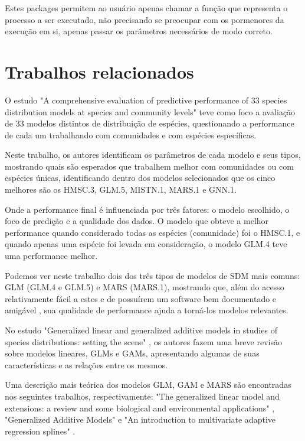 \documentclass[
    12pt,               %
    openright,          %
    oneside,            %
    a4paper,            %
    english,            %
    brazil              %
    ]{abntex2}
\begin{document}
Estes packages permitem ao usuário apenas chamar a função que representa o processo a ser executado, não precisando se preocupar com
os pormenores da execução em si, apenas passar os parâmetros necessários de modo correto.

\section{Trabalhos relacionados}

O estudo "A comprehensive evaluation of predictive performance of 33 species distribution models at species and community levels"
\cite{predPerform33models} teve como foco a avaliação de 33 modelos distintos de distribuição de espécies, questionando a
performance de cada um trabalhando com comunidades e com espécies específicas.

Neste trabalho, os autores identificam os parâmetros de cada modelo e seus tipos, mostrando quais são esperados que trabalhem melhor
com comunidades ou com espécies únicas, identificando dentro dos modelos selecionados que os cinco melhores são os HMSC.3, GLM.5,
MISTN.1, MARS.1 e GNN.1.

Onde a performance final é influenciada por três fatores: o modelo escolhido, o foco de predição e a qualidade dos dados. O modelo
que obteve a melhor performance quando considerado todas as espécies (comunidade) foi o HMSC.1, e quando apenas uma 
espécie foi levada em consideração, o modelo GLM.4 teve uma performance melhor.

Podemos ver neste trabalho dois dos três tipos de modelos de SDM mais comuns: GLM (GLM.4 e GLM.5) e MARS (MARS.1), mostrando que,
além do acesso relativamente fácil a estes e de possuírem um software bem documentado e amigável \cite{predPerform33models}, sua 
qualidade de performance ajuda a torná-los modelos relevantes.

No estudo "Generalized linear and generalized additive models in studies of species distributions: setting the scene" 
\cite{GAMeGLM_especie_estudo}, os autores fazem uma breve revisão sobre modelos lineares, GLMs e GAMs, apresentando algumas
de suas características e as relações entre os mesmos.

Uma descrição mais teórica dos modelos GLM, GAM e MARS são encontradas nos seguintes trabalhos, respectivamente: "The generalized 
linear model and extensions: a review and some biological and environmental applications" \cite{GLM}, "Generalized Additive Models"
\cite{GAM} e "An introduction to multivariate adaptive regression splines" \cite{MARS}.
\end{document}
